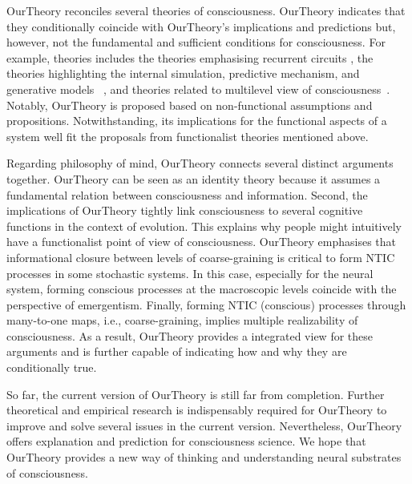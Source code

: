 \documentclass[utf8]{article}
\begin{document}
    
    \ac{OurTheory} reconciles several theories of consciousness. \ac{OurTheory} indicates that they conditionally coincide with \ac{OurTheory}'s implications and predictions but, however, not the fundamental and sufficient conditions for consciousness. For example, theories includes the theories emphasising recurrent circuits \citep{lamme2006towards, edelman1992bright}, the theories highlighting the internal simulation,  predictive mechanism, and generative models ~\citep{revonsuo2006inner, clark_2013,Hohwy2013,SethPP2014, kanai_chang_yu_de_abril_biehl_guttenberg_2019, seth2014predictive, seth2015presence}, and theories related to multilevel view of consciousness~\citep{pennartz2018consciousness,pennartz2015brain,prinz2007intermediate, jackendoff1987consciousness}. Notably, \ac{OurTheory} is proposed based on non-functional assumptions and propositions. Notwithstanding, its implications for the functional aspects of a system well fit the proposals from functionalist theories mentioned above. 
	
	
	Regarding philosophy of mind, \ac{OurTheory} connects several distinct arguments together. \ac{OurTheory} can be seen as an identity theory because it assumes a fundamental relation between consciousness and information. Second, the implications of \ac{OurTheory} tightly link consciousness to several cognitive functions in the context of evolution. This explains why people might intuitively have a functionalist point of view of consciousness. \ac{OurTheory} emphasises that informational closure between levels of coarse-graining is critical to form NTIC processes in some stochastic systems. In this case, especially for the neural system, forming conscious processes at the macroscopic levels coincide with the perspective of emergentism. Finally, forming NTIC (conscious) processes through many-to-one maps, i.e., coarse-graining, implies multiple realizability of consciousness. As a result, \ac{OurTheory} provides a integrated view for these arguments and is further capable of indicating how and why they are conditionally true.

	So far, the current version of \ac{OurTheory} is still far from completion. Further theoretical and empirical research is indispensably required for \ac{OurTheory} to improve and solve several issues in the current version. Nevertheless, \ac{OurTheory} offers explanation and prediction for consciousness science. We hope that \ac{OurTheory} provides a new way of thinking and understanding neural substrates of consciousness.  
	
\end{document}
